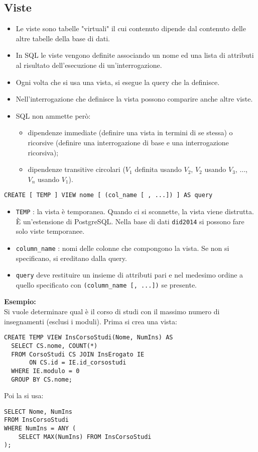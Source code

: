 \documentclass[a4paper, 10pt, titlepage]{article}
\begin{document}
	\subsection{Viste}
		\begin{itemize}
				\item Le viste sono tabelle "virtuali" il cui contenuto dipende dal contenuto
				delle altre tabelle della base di dati.
				\item In SQL le viste vengono definite associando un nome ed una lista di
				attributi al risultato dell’esecuzione di un’interrogazione.
				\item Ogni volta che si usa una vista, si esegue la query che la definisce.
				\item Nell’interrogazione che definisce la vista possono comparire anche altre
				viste.
				\item SQL non ammette però:
				\begin{itemize}
						\item dipendenze immediate (definire una vista in termini di se stessa) o
					ricorsive (definire una interrogazione di base e una interrogazione
					ricorsiva);
						\item dipendenze transitive circolari ($ V_1 $ definita usando $ V_2 $, $ V_2 $ usando $ V_3 $, $ \dots $, $ V_n $ usando $ V_1 $).
					\end{itemize}
			\end{itemize}
		\begin{lstlisting}
CREATE [ TEMP ] VIEW nome [ (col_name [ , ...]) ] AS query
		\end{lstlisting}
		\noindent
		\begin{itemize}
				\item \lstinline|TEMP| : la vista è temporanea. Quando ci si sconnette, la vista viene
			distrutta. È un’estensione di PostgreSQL. Nella base di dati \lstinline|did2014| si
			possono fare solo viste temporanee.
			\item \lstinline|column_name| : nomi delle colonne che compongono la vista. Se non si
			specificano, si ereditano dalla query.
			\item \lstinline|query| deve restituire un insieme di attributi pari e nel medesimo ordine
			a quello specificato con \lstinline|(column_name [, ...])| se presente.
			\end{itemize}
		\bigskip
		\textbf{Esempio:}\\
		Si vuole determinare qual è il corso di studi con il massimo numero di
		insegnamenti (esclusi i moduli).
		Prima si crea una vista:
	\begin{lstlisting}
CREATE TEMP VIEW InsCorsoStudi(Nome, NumIns) AS
  SELECT CS.nome, COUNT(*)
  FROM CorsoStudi CS JOIN InsErogato IE 
       ON CS.id = IE.id_corsostudi
  WHERE IE.modulo = 0
  GROUP BY CS.nome;
	\end{lstlisting}
		Poi la si usa:
		\begin{lstlisting}
SELECT Nome, NumIns
FROM InsCorsoStudi
WHERE NumIns = ANY (
    SELECT MAX(NumIns) FROM InsCorsoStudi
);

		\end{lstlisting}
		
\end{document}
